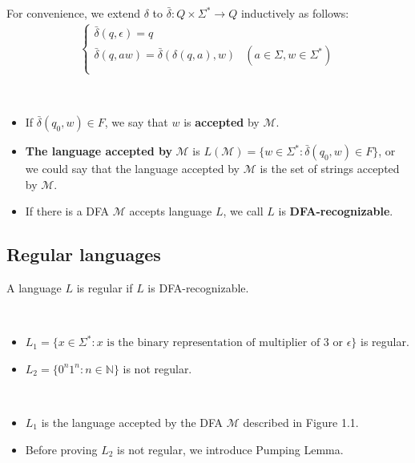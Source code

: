 \begin{definition}
    For convenience, we extend $\delta$ to $\bar{\delta}: Q \times \Sigma^{*} \to Q$ inductively as follows:
    \begin{align*}
        \begin{cases}
            \bar{\delta}(q,\epsilon) = q & ~ \\
            \bar{\delta}(q,aw) = \bar{\delta}(\delta(q,a),w) & (a \in \Sigma, w \in \Sigma^{*}) \\
        \end{cases}
    \end{align*}
\end{definition}

\begin{definition} ~
\begin{itemize}
    \item If $\bar{\delta}(q_0, w) \in F$, we say that $w$ is \textbf{accepted} by $\mathcal{M}$.
    \item \textbf{The language accepted by} $\mathcal{M}$ is $L(\mathcal{M}) = \{ w \in \Sigma^{*}: \bar{\delta}(q_0,w)\in F \}$, or we could say that the language accepted by $\mathcal{M}$ is the set of strings accepted by $\mathcal{M}$.
    \item If there is a DFA $\mathcal{M}$ accepts language $L$, we call $L$ is \textbf{DFA-recognizable}.
\end{itemize}
\end{definition}

\subsection{Regular languages} \label{sec:}

\begin{definition}
A language $L$ is regular if $L$ is DFA-recognizable.
\end{definition}

\begin{eg} ~
\begin{itemize}
    \item $L_1 = \{ x \in \Sigma^{*} : x \text{ is the binary representation of multiplier of 3 or } \epsilon \}$ is regular.
    \item $L_2 = \{ 0^{n}1^{n} : n \in \mathbb{N} \}$ is not regular.
\end{itemize}
\end{eg}
\begin{explanation} ~
    \begin{itemize}
        \item $L_1$ is the language accepted by the DFA $\mathcal{M}$ described in Figure 1.1.
        \item Before proving $L_2$ is not regular, we introduce Pumping Lemma.
    \end{itemize}
\end{explanation}

